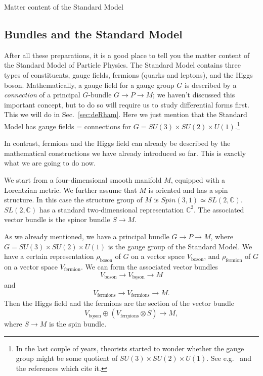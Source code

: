 \documentclass[12pt]{article}
\numberwithin{equation}{section}
\numberwithin{figure}{section}
\theoremstyle{remark}
\def\bC{\mathbb{C}}
\begin{document}
\begin{example}
Matter content of the Standard Model
\end{example}
\fi

\subsection{Bundles and the Standard Model}
\label{sec:SM}

After all these preparations, it is a good place to tell you the matter content of the Standard Model of Particle Physics.
The Standard Model contains three types of constituents,
  gauge fields,
  fermions (quarks and leptons), and 
  the Higgs boson.
Mathematically, a gauge field for a gauge group $G$ is described by 
a \emph{connection} of a principal $G$-bundle $G\to P\to M$;
we haven't discussed this important concept,
but to do so will require us to study differential forms first.
This we will do in Sec.~\ref{sec:deRham}.
Here we just mention that the Standard Model has 
gauge fields = connections for $G=SU(3)\times SU(2)\times U(1)$.\footnote{%
In the last couple of years, theorists started to wonder whether the gauge
group might be some quotient of $SU(3)\times SU(2)\times U(1)$.
See e.g.~\cite{Tong:2017oea} and the references which cite it.
}

In contrast, fermions and the Higgs field can already be described by the
mathematical constructions we have already introduced so far. 
This is exactly what we are going to do now.

We start from a four-dimensional smooth manifold $M$,
equipped with a Lorentzian metric.
We further assume that $M$ is oriented and has a spin structure.
In this case the structure group of $M$ is $Spin(3,1)\simeq SL(2,\bC)$.
$SL(2,\bC)$ has a standard two-dimensional representation $\bC^2$.
The associated vector bundle is the spinor bundle $S\to M$.

As we already mentioned, we have a principal bundle $G\to P\to M$,
where $G=SU(3)\times SU(2)\times U(1)$ is the gauge group of the Standard Model.
We have a certain representation $\rho_\text{boson}$ of $G$ on a vector space $V_\text{boson}$,
and $\rho_\text{fermion}$ of $G$ on a vector space $V_\text{fermion}$.
We can form the associated vector bundles 
\begin{equation}
V_\text{boson}\to \underline{V_\text{boson}}\to M
\end{equation}
and
\begin{equation}
V_\text{fermions}\to \underline{V_\text{fermions}}\to M.
\end{equation}
Then the Higgs field and the fermions are the section
of the vector bundle
\begin{equation}
  \underline{V_\text{boson}} 
  \oplus
  (\underline{V_\text{fermions}}\otimes S)
  \to M,
\end{equation}
where $S\to M$ is the spin bundle.
\end{document}

